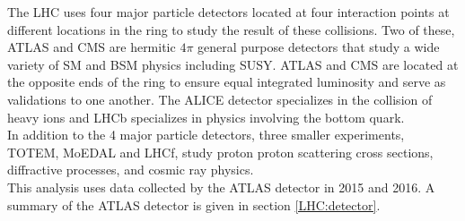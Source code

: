 \indent The LHC uses four major particle detectors located at four interaction points at different locations in the ring to study the result of these collisions.  Two of these, ATLAS and CMS are hermitic $4\pi$ general purpose detectors that study a wide variety of SM and BSM physics including SUSY.   ATLAS and CMS are located at the opposite ends of the ring to ensure equal integrated luminosity and serve as validations to one another.  The ALICE detector specializes in the collision of heavy ions and LHCb specializes in physics involving the bottom quark. \\

\indent In addition to the 4 major particle detectors, three smaller experiments, TOTEM, MoEDAL and LHCf, study proton proton scattering cross sections, diffractive processes, and cosmic ray physics.  ~\\

\indent This analysis uses data collected by the ATLAS detector in 2015 and 2016.  A summary of the ATLAS detector is given in section \ref{LHC:detector}. \\




